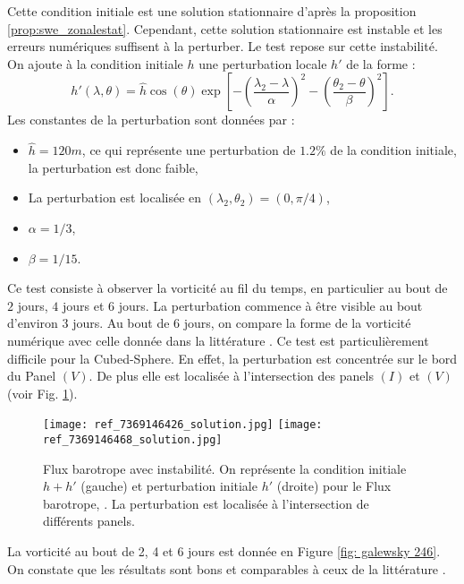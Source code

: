 Cette condition initiale est une solution stationnaire d'après la proposition \ref{prop:swe_zonalestat}. Cependant, cette solution stationnaire est instable et les erreurs numériques suffisent à la perturber. Le test repose sur cette instabilité. On ajoute à la condition initiale $h$ une perturbation locale $h'$ de la forme :
\begin{equation}
h'(\lambda, \theta) = \hat{h} \cos ( \theta ) \exp \left[ - \left( \dfrac{\lambda_2 - \lambda}{\alpha} \right)^2 - \left( \dfrac{\theta_2 - \theta}{\beta} \right)^2 \right].
\end{equation}
Les constantes de la perturbation sont données par :
\begin{itemize}
\item $\hat{h} = 120 \si{m}$, ce qui représente une perturbation de $1.2 \%$ de la condition initiale, la perturbation est donc faible,
\item La perturbation est localisée en $(\lambda_2, \theta_2) = (0, \pi/4)$,
\item $\alpha = 1/3$,
\item $\beta = 1/15$.
\end{itemize}

Ce test consiste à observer la vorticité au fil du temps, en particulier au bout de $2$ jours, $4$ jours et $6$ jours. La perturbation commence à être visible au bout d'environ 3 jours. Au bout de 6 jours, on compare la forme de la vorticité numérique avec celle donnée dans la littérature \cite{Galewsky2004, Chen2008}. Ce test est particulièrement difficile pour la Cubed-Sphere. En effet, la perturbation est concentrée sur le bord du Panel $(V)$. De plus elle est localisée à l'intersection des panels $(I)$ et $(V)$ (voir Fig. \ref{fig: initiale et perturbation Galewsky}).

\begin{figure}[htbp]
\begin{center}
\texttt{[image: ref\_7369146426\_solution.jpg]}
\texttt{[image: ref\_7369146468\_solution.jpg]}
\end{center}
\caption{Flux barotrope avec instabilité. On représente la condition initiale $h+h'$ (gauche) et perturbation initiale $h'$ (droite) pour le Flux barotrope, \cite{Galewsky2004}. La perturbation est localisée à l'intersection de différents panels.}
\label{fig: initiale et perturbation Galewsky}
\end{figure}

La vorticité au bout de 2, 4 et 6 jours est donnée en Figure \ref{fig: galewsky 246}. On constate que les résultats sont bons et comparables à ceux de la littérature \cite{Chen2008, Galewsky2004, Nair2005}. 

